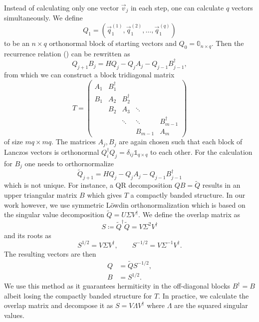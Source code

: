 Instead of calculating only one vector $\vec{v}_j$ in each step,
one can calculate $q$ vectors simultaneously.
We define
\begin{equation}
    Q_1 = (\vec{q}_1^{(1)}, \vec{q}_1^{(2)}, \ldots, \vec{q}_1^{(q)})
\end{equation}
to be an $n\times q$ orthonormal block of starting vectors
and $Q_0 = \mathbb{0}_{n\times q}$.
Then the recurrence relation () can be rewritten as
\begin{equation}
    Q_{j+1} B_j = H Q_j - Q_j A_j - Q_{j-1} B_{j-1}^\dag,
    \label{eq:block-Lanczos-recurrence}
\end{equation}
from which we can construct a block tridiagonal matrix
\begin{equation}
    T
    =
    \begin{pmatrix}
        A_1 & B_1^\dag &          &         &              \\
        B_1 & A_2      & B_2^\dag &         &              \\
            & B_2      & A_3      & \ddots  &              \\
            &          & \ddots   & \ddots  & B_{m-1}^\dag \\
            &          &          & B_{m-1} & A_m
    \end{pmatrix}
\end{equation}
of size $mq\times mq$.
The matrices $A_j, B_j$ are again chosen such that each block of Lanczos vectors is orthonormal
$Q_i^\dag Q_j = \delta_{ij}\mathbb{1}_{q\times q}$ to each other.
For the calculation for $B_j$ one needs to orthornormalize
\begin{equation}
    \tilde Q_{j+1} = H Q_j - Q_j A_j - Q_{j-1} B_{j-1}^\dag
\end{equation}
which is not unique.
For instance, a QR decomposition \cite{Cullum1985, Grimes1994} $Q B = \tilde{Q}$
results in an upper triangular matrix $B$ which gives $T$ a compactly banded structure.
In our work however, we use symmetric Löwdin orthonormalization \cite{Lowdin1950, Brass2021}
which is based on the singular value decomposition $\tilde Q = U \Sigma V^\dag$.
We define the overlap matrix as
\begin{equation}
    S \coloneqq \tilde Q^\dag \tilde Q = V \Sigma^{2} V^\dagger
\end{equation}
and its roots as
\begin{equation}
    S^{1/2}  = V \Sigma V^\dagger, \qquad S^{-1/2} = V \Sigma^{-1} V^\dagger.
\end{equation}
The resulting vectors are then
\begin{align}
    Q & = \tilde Q S^{-1/2}, \\
    B & = S^{1/2}.
\end{align}
We use this method as it guarantees hermiticity in the off-diagonal blocks $B^\dag = B$
albeit losing the compactly banded structure for $T$.
In practice, we calculate the overlap matrix and decompose it as $S = V \Lambda V^\dag$
where $\Lambda$ are the squared singular values.

